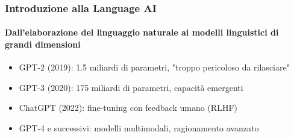 \begin{frame}[t,fragile] \frametitle{Introduzione alla Language AI}
	{\scriptsize
		\onslide<1->
            \framesubtitle{Dall'elaborazione del linguaggio naturale ai modelli linguistici di grandi dimensioni}
            \vspace*{-15pt}
	    	\begin{minipage}[t]{\textwidth}
				\begin{minipage}[t]{0.6\textwidth}
	    			\begin{itemize}[leftmargin=10pt,align=right]
						\onslide<2->\item[\alert{\faHandORight}] \alert{GPT-2 (2019):} 1.5 miliardi di parametri, "troppo pericoloso da rilasciare"
						\onslide<3->\item[\alert{\faHandORight}] \alert{GPT-3 (2020):} 175 miliardi di parametri, capacità emergenti
						\onslide<4->\item[\alert{\faHandORight}] \alert{ChatGPT (2022):} fine-tuning con feedback umano (RLHF)
						\onslide<5->\item[\alert{\faHandORight}] \alert{GPT-4 e successivi:} modelli multimodali, ragionamento avanzato
					\end{itemize}
            	\end{minipage}
	    	\end{minipage}
	}
\end{frame}
%
